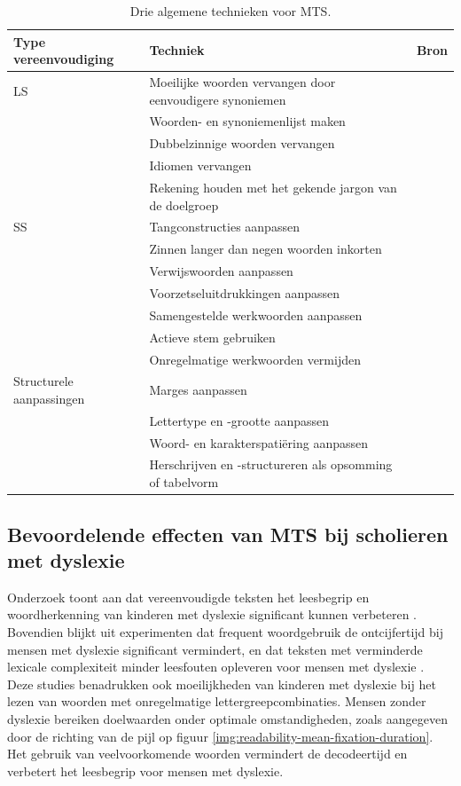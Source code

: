 \begin{center}
		\begin{table}[H]
			\begin{tabular}{ | m{4cm} | m{8cm} | m{3cm} | } 
			\hline
			Type vereenvoudiging & Techniek & Bron \\ \hline
			
			LS & Moeilijke woorden vervangen door eenvoudigere synoniemen & \autocite{Rello2013c, Siddharthan2014} \\ 
				& Woorden- en synoniemenlijst maken & \\
				& Dubbelzinnige woorden vervangen & \\
				& Idiomen vervangen & \\ 
				& Rekening houden met het gekende jargon van de doelgroep &\\
			\hline
			SS & Tangconstructies aanpassen &\\
			& Zinnen langer dan negen woorden inkorten &\\
			& Verwijswoorden aanpassen &\\
			& Voorzetseluitdrukkingen aanpassen &\\
			& Samengestelde werkwoorden aanpassen &\\
			& Actieve stem gebruiken & \autocite{Ruelas2020} \\
			& Onregelmatige werkwoorden vermijden &\\
			\hline
			Structurele aanpassingen & Marges aanpassen &\\
			& Lettertype en -grootte aanpassen &\\
			& Woord- en karakterspatiëring aanpassen &\\
			& Herschrijven en -structureren als opsomming of tabelvorm &\\
			\hline
		\end{tabular}
		\caption{Drie algemene technieken voor MTS.}
		\label{table:manual-simplification}
	\end{table}
\end{center}

\subsection{Bevoordelende effecten van MTS bij scholieren met dyslexie}

Onderzoek toont aan dat vereenvoudigde teksten het leesbegrip en woordherkenning van kinderen met dyslexie significant kunnen verbeteren \autocite{RiveroContreras2021}. Bovendien blijkt uit experimenten dat frequent woordgebruik de ontcijfertijd bij mensen met dyslexie significant vermindert, en dat teksten met verminderde lexicale complexiteit minder leesfouten opleveren voor mensen met dyslexie \autocite{Rello2013a, Gala2016}. Deze studies benadrukken ook moeilijkheden van kinderen met dyslexie bij het lezen van woorden met onregelmatige lettergreepcombinaties. Mensen zonder dyslexie bereiken doelwaarden onder optimale omstandigheden, zoals aangegeven door de richting van de pijl op figuur \ref{img:readability-mean-fixation-duration}. Het gebruik van veelvoorkomende woorden vermindert de decodeertijd en verbetert het leesbegrip voor mensen met dyslexie.

